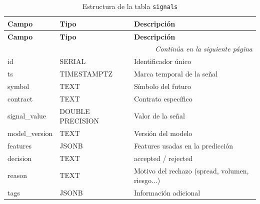 \begin{longtable}{l l l}
\caption{Estructura de la tabla \texttt{signals}} \\
\toprule
\textbf{Campo} & \textbf{Tipo} & \textbf{Descripción} \\
\midrule
\endfirsthead

\toprule
\textbf{Campo} & \textbf{Tipo} & \textbf{Descripción} \\
\midrule
\endhead

\midrule
\multicolumn{3}{r}{\textit{Continúa en la siguiente página}} \\
\midrule
\endfoot

\bottomrule
\endlastfoot

id                & SERIAL            & Identificador único \\
ts                & TIMESTAMPTZ       & Marca temporal de la señal \\
symbol            & TEXT              & Símbolo del futuro \\
contract          & TEXT              & Contrato específico \\
signal\_value     & DOUBLE PRECISION  & Valor de la señal \\
model\_version    & TEXT              & Versión del modelo \\
features          & JSONB             & Features usadas en la predicción \\
decision          & TEXT              & accepted / rejected \\
reason            & TEXT              & Motivo del rechazo (spread, volumen, riesgo...) \\
tags              & JSONB             & Información adicional \\
\end{longtable}
